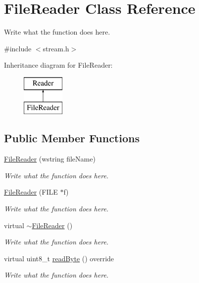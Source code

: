 \hypertarget{classFileReader}{\section{File\+Reader Class Reference}
\label{classFileReader}
}


Write what the function does here.  




{\ttfamily \#include $<$stream.\+h$>$}

Inheritance diagram for File\+Reader\+:\begin{figure}[H]
\begin{center}
\leavevmode
\includegraphics[height=2.000000cm]{classFileReader}
\end{center}
\end{figure}
\subsection*{Public Member Functions}
\begin{DoxyCompactItemize}
\item 
\hyperlink{classFileReader_a50ceae995b470d627f94caea10cd9956}{File\+Reader} (wstring file\+Name)
\begin{DoxyCompactList}\small\item\em Write what the function does here. \end{DoxyCompactList}\item 
\hyperlink{classFileReader_a3a06f152a16bd06550c3a4efeaed8ed2}{File\+Reader} (F\+I\+L\+E $\ast$f)
\begin{DoxyCompactList}\small\item\em Write what the function does here. \end{DoxyCompactList}\item 
virtual \hyperlink{classFileReader_a029d1ddebda388d1f0f5a99ce9acb311}{$\sim$\+File\+Reader} ()
\begin{DoxyCompactList}\small\item\em Write what the function does here. \end{DoxyCompactList}\item 
virtual uint8\+\_\+t \hyperlink{classFileReader_ac148435542dea9596532f2c3dd3c7668}{read\+Byte} () override
\begin{DoxyCompactList}\small\item\em Write what the function does here. \end{DoxyCompactList}\end{DoxyCompactItemize}
